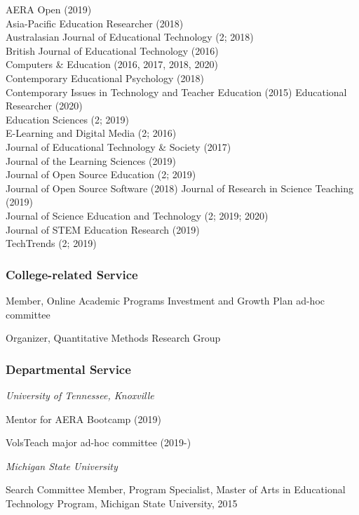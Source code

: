 \documentclass[
  11pt,
]{article}
\begin{document}
AERA Open (2019)\\
Asia-Pacific Education Researcher (2018)\\
Australasian Journal of Educational Technology (2; 2018)\\
British Journal of Educational Technology (2016)\\
Computers \& Education (2016, 2017, 2018, 2020)\\
Contemporary Educational Psychology (2018)\\
Contemporary Issues in Technology and Teacher Education (2015)
Educational Researcher (2020)\\
Education Sciences (2; 2019)\\
E-Learning and Digital Media (2; 2016)\\
Journal of Educational Technology \& Society (2017)\\
Journal of the Learning Sciences (2019)\\
Journal of Open Source Education (2; 2019)\\
Journal of Open Source Software (2018) Journal of Research in Science
Teaching (2019)\\
Journal of Science Education and Technology (2; 2019; 2020)\\
Journal of STEM Education Research (2019)\\
TechTrends (2; 2019)

\hypertarget{college-related-service}{%
\subsubsection{College-related Service}\label{college-related-service}}

Member, Online Academic Programs Investment and Growth Plan ad-hoc
committee

Organizer, Quantitative Methods Research Group

\hypertarget{departmental-service}{%
\subsubsection{Departmental Service}\label{departmental-service}}

\emph{University of Tennessee, Knoxville}

Mentor for AERA Bootcamp (2019)

VolsTeach major ad-hoc committee (2019-)

\emph{Michigan State University}

Search Committee Member, Program Specialist, Master of Arts in
Educational Technology Program, Michigan State University, 2015
\end{document}
